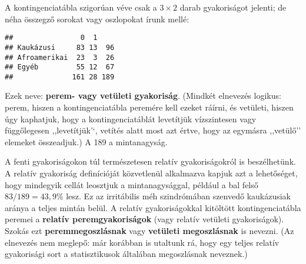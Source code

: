 \documentclass[]{book}
\newenvironment{Shaded}{\begin{snugshade}}{\end{snugshade}}
\newcommand{\KeywordTok}[1]{\textcolor[rgb]{0.13,0.29,0.53}{\textbf{#1}}}
\newcommand{\DecValTok}[1]{\textcolor[rgb]{0.00,0.00,0.81}{#1}}
\newcommand{\StringTok}[1]{\textcolor[rgb]{0.31,0.60,0.02}{#1}}
\newcommand{\OperatorTok}[1]{\textcolor[rgb]{0.81,0.36,0.00}{\textbf{#1}}}
\newcommand{\NormalTok}[1]{#1}
\begin{document}
A kontingenciatábla szigorúan véve csak a \(3 \times 2\) darab
gyakoriságot jelenti; de néha összegző sorokat vagy oszlopokat írunk
mellé:

\begin{Shaded}
\end{Shaded}

\begin{verbatim}
##                0  1    
## Kaukázusi     83 13  96
## Afroamerikai  23  3  26
## Egyéb         55 12  67
##              161 28 189
\end{verbatim}

Ezek neve: \textbf{perem- vagy vetületi gyakoriság}. (Mindkét elnevezés
logikus: perem, hiszen a kontingenciatábla peremére kell ezeket ráírni,
és vetületi, hiszen úgy kaphatjuk, hogy a kontingenciatáblát levetítjük
vízszintesen vagy függőlegesen ,,levetítjük'`, vetítés alatt most azt
értve, hogy az egymásra ,,vetülő'' elemeket összeadjuk.) A 189 a
mintanagyság.

A fenti gyakoriságokon túl természetesen relatív gyakoriságokról is
beszélhetünk. A relatív gyakoriság definícióját közvetlenül alkalmazva
kapjuk azt a lehetőséget, hogy mindegyik cellát leosztjuk a
mintanagysággal, például a bal felső \(83/189=43,\!9\)\% lesz. Ez az
irritábilis méh szindrómában szenvedő kaukázusiak aránya a teljes mintán
belül. A relatív gyakoriságokkal kitöltött kontingenciatábla peremei a
\textbf{relatív peremgyakoriságok} (vagy relatív vetületi gyakoriságok).
Szokás ezt \textbf{peremmegoszlásnak} vagy \textbf{vetületi
megoszlásnak} is nevezni. (Az elnevezés nem meglepő: már korábban is
utaltunk rá, hogy egy teljes relatív gyakorisági sort a statisztikusok
általában megoszlásnak neveznek.)
\end{document}
